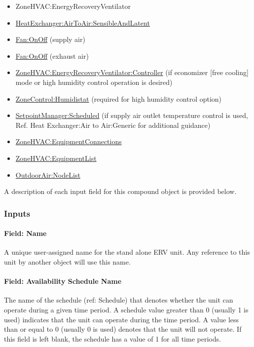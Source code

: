 \begin{itemize}
\item
  ZoneHVAC:EnergyRecoveryVentilator
\item
  \hyperref[heatexchangerairtoairsensibleandlatent]{HeatExchanger:AirToAir:SensibleAndLatent}
\item
  \hyperref[fanonoff]{Fan:OnOff} (supply air)
\item
  \hyperref[fanonoff]{Fan:OnOff} (exhaust air)
\item
  \hyperref[zonehvacenergyrecoveryventilatorcontroller]{ZoneHVAC:EnergyRecoveryVentilator:Controller} (if economizer {[}free cooling{]} mode or high humidity control operation is desired)
\item
  \hyperref[zonecontrolhumidistat]{ZoneControl:Humidistat} (required for high humidity control option)
\item
  \hyperref[setpointmanagerscheduled]{SetpointManager:Scheduled} (if supply air outlet temperature control is used, Ref. Heat Exchanger:Air to Air:Generic for additional guidance)
\item
  \hyperref[zonehvacequipmentconnections]{ZoneHVAC:EquipmentConnections}
\item
  \hyperref[zonehvacequipmentlist]{ZoneHVAC:EquipmentList}
\item
  \hyperref[outdoorairnodelist]{OutdoorAir:NodeList}
\end{itemize}

A description of each input field for this compound object is provided below.

\subsubsection{Inputs}\label{inputs-13-018}

\paragraph{Field: Name}\label{field-name-13-012}

A unique user-assigned name for the stand alone ERV unit. Any reference to this unit by another object will use this name.

\paragraph{Field: Availability Schedule Name}\label{field-availability-schedule-name-12-001}

The name of the schedule (ref: Schedule) that denotes whether the unit can operate during a given time period. A schedule value greater than 0 (usually 1 is used) indicates that the unit can operate during the time period. A value less than or equal to 0 (usually 0 is used) denotes that the unit will not operate. If this field is left blank, the schedule has a value of 1 for all time periods.

